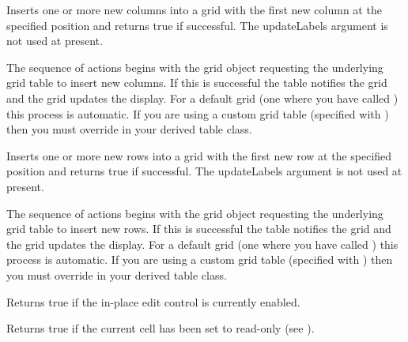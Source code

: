 Inserts one or more new columns into a grid with the first new column at the
specified position and returns true if successful. The updateLabels argument is not
used at present.

The sequence of actions begins with the grid object requesting the underlying grid
table to insert new columns. If this is successful the table notifies the grid and the
grid updates the display. For a default grid (one where you have called
) this process is automatic. If you are
using a custom grid table (specified with )
then you must override
 in your derived
table class.



\label{wxgridinsertrows}


Inserts one or more new rows into a grid with the first new row at the specified
position and returns true if successful. The updateLabels argument is not used at
present.

The sequence of actions begins with the grid object requesting the underlying grid
table to insert new rows. If this is successful the table notifies the grid and the
grid updates the display. For a default grid (one where you have called
) this process is automatic. If you are
using a custom grid table (specified with )
then you must override
 in your derived
table class.



\label{wxgridiscelleditcontrolenabled}


Returns true if the in-place edit control is currently enabled.



\label{wxgridiscurrentcellreadonly}


Returns true if the current cell has been set to read-only
(see ).



